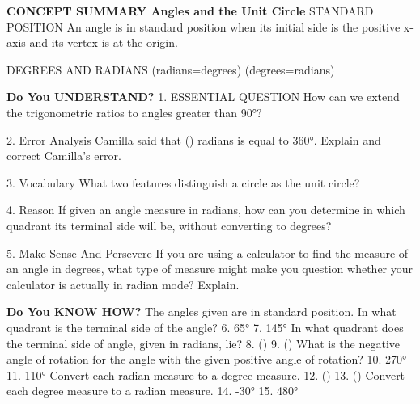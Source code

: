 \documentclass{article}
\newenvironment{concept-summary}{}{}    %
\newcommand{\answer}[1]{}               %
\newcommand{\placeholder}[2]{}          %
\newcommand{\te}[1]{}                   %
\begin{document}
\begin{concept-summary}
\textbf{CONCEPT SUMMARY Angles and the Unit Circle}
STANDARD POSITION
An angle is in standard position when its initial side is the positive x-axis and its vertex is at the origin.
\placeholder{graph}{Black arrowed x,y axes without ticks; blue initial side ray on positive x, red terminal side ray in II, labeled initial side and terminal side. Red counterclockwise arc theta.}
DEGREES AND RADIANS
(radians=\frac{}\cdot degrees)
(degrees=\pi\cdot radians)
\placeholder{graph}{Red unit circle on black arrowed x,y axes, cardinal points marked0,90,180,270 in red, with blue pi/2,pi,3pi/2. Three marked points in I labeled pi/3 radians=60°,pi/4 radians=45°,pi/6 radians=30°. No coordinate ticks.}
\textbf{Do You UNDERSTAND?}
1. ESSENTIAL QUESTION How can we extend the trigonometric ratios to angles greater than 90°?
\answer{by plotting angles on a unit circle and identifying their reference angles}
2. Error Analysis Camilla said that (\pi) radians is equal to 360°. Explain and correct Camilla's error.
\answer{(\pi) is equal to 180° and (2\pi) is equal to 360°.}
3. Vocabulary What two features distinguish a circle as the unit circle?
\answer{A unit circle's center is at the origin, and its radius is 1.}
4. Reason If given an angle measure in radians, how can you determine in which quadrant its terminal side will be, without converting to degrees?
\answer{Since the circumference of a unit circle is (2\pi), each quadrant covers (\frac14) or (\frac\pi2). You can compare the angle measures in radians to 0, (\frac\pi2), (\pi), and (\frac{3\pi}{2}) to determine in which quadrant the angle falls.}
5. Make Sense And Persevere If you are using a calculator to find the measure of an angle in degrees, what type of measure might make you question whether your calculator is actually in radian mode? Explain.
\answer{Since radian measures of angles are usually less than or equal to (2\pi), if the answer is very small or written in terms of (\pi), it is likely in radian mode.}
\textbf{Do You KNOW HOW?}
The angles given are in standard position. In what quadrant is the terminal side of the angle?
6. 65° \answer{Quadrant I}
7. 145° \answer{Quadrant II}
In what quadrant does the terminal side of angle, given in radians, lie?
8. (\frac{}) \answer{Quadrant I}
9. () \answer{Quadrant IV}
What is the negative angle of rotation for the angle with the given positive angle of rotation?
10. 270° \answer{-90°}
11. 110° \answer{-250°}
Convert each radian measure to a degree measure.
12. (\frac{}) \answer{60°}
13. () \answer{315°}
Convert each degree measure to a radian measure.
14. -30° \answer{(-\frac\pi6)}
15. 480° \answer{(\frac{8\pi}{3})}
\te{Concept Summary, Do You Understand, and Do You Know How are available at SavvasRealize.com. Presentation; Practice.}
\end{concept-summary}
\end{document}
